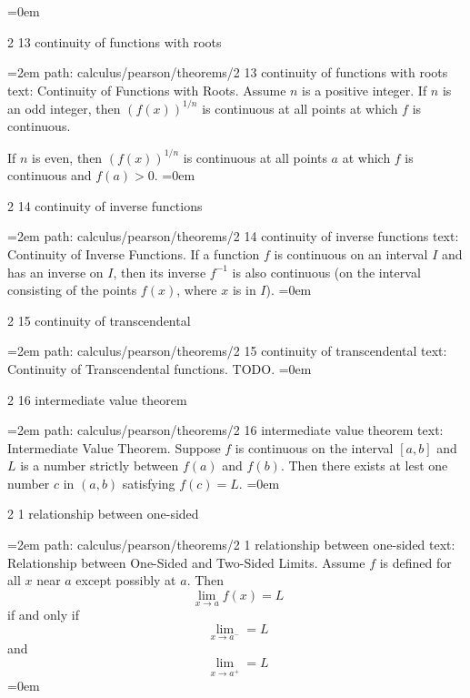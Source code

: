 \smallskip
\leftskip=0em
\par\endgroup
\bigskip
{}
2 13 continuity of functions with roots
\smallskip
\par\begingroup
\leftskip=2em
path: calculus/pearson/theorems/2 13 continuity of functions with roots
\smallskip
text:  Continuity of Functions with Roots. Assume $n$ is a positive integer. If $n$ is an odd integer, then $(f(x))^{1/n}$ is continuous at all points at which $f$ is continuous. \par If $n$ is even, then $(f(x))^{1/n}$ is continuous at all points $a$ at which $f$ is continuous and $f(a) > 0$.
\smallskip
\leftskip=0em
\par\endgroup
\bigskip
{}
2 14 continuity of inverse functions
\smallskip
\par\begingroup
\leftskip=2em
path: calculus/pearson/theorems/2 14 continuity of inverse functions
\smallskip
text:  Continuity of Inverse Functions. If a function $f$ is continuous on an interval $I$ and has an inverse on $I$, then its inverse $f^{-1}$ is also continuous (on the interval consisting of the points $f(x)$, where $x$ is in $I$).
\smallskip
\leftskip=0em
\par\endgroup
\bigskip
{}
2 15 continuity of transcendental
\smallskip
\par\begingroup
\leftskip=2em
path: calculus/pearson/theorems/2 15 continuity of transcendental
\smallskip
text:  Continuity of Transcendental functions. TODO.
\smallskip
\leftskip=0em
\par\endgroup
\bigskip
{}
2 16 intermediate value theorem
\smallskip
\par\begingroup
\leftskip=2em
path: calculus/pearson/theorems/2 16 intermediate value theorem
\smallskip
text:  Intermediate Value Theorem. Suppose $f$ is continuous on the interval $[a, b]$ and $L$ is a number strictly between $f(a)$ and $f(b)$. Then there exists at lest one number $c$ in $(a, b)$ satisfying $f(c) = L$.
\smallskip
\leftskip=0em
\par\endgroup
\bigskip
{}
2 1 relationship between one-sided
\smallskip
\par\begingroup
\leftskip=2em
path: calculus/pearson/theorems/2 1 relationship between one-sided
\smallskip
text:  Relationship between One-Sided and Two-Sided Limits. Assume $f$ is defined for all $x$ near $a$ except possibly at $a$. Then  $$\ \lim_{x \to a} f(x) = L $$  if and only if  $$\ \lim_{x \to a^{-}} = L $$  and  $$\ \lim_{x \to a^{+}} = L $$
\smallskip
\leftskip=0em
\par\endgroup
